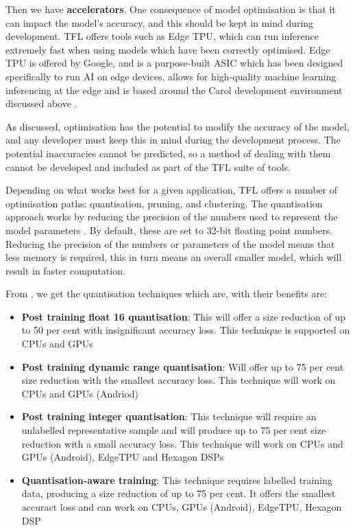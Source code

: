 \documentclass[conference]{IEEEtran}
\begin{document}
Then we have \textbf{accelerators}. One consequence of model optimisation is that it can impact the model's accuracy, and this should be kept in mind during development. TFL offers tools such as Edge TPU, which can run inference extremely fast when using models which have been correctly optimised. Edge TPU is offered by Google, and is a purpose-built ASIC which has been designed specifically to run AI on edge devices, allows for high-quality machine learning inferencing at the edge and is based around the Carol development environment discussed above \cite{b14}.

As discussed, optimisation has the potential to modify the accuracy of the model, and any developer must keep this in mind during the development process. The potential inaccuracies cannot be predicted, so a method of dealing with them cannot be developed and included as part of the TFL suite of tools.

Depending on what works best for a given application, TFL offers a number of optimisation paths: quantisation, pruning, and clustering. The quantisation approach works by reducing the precision of the numbers used to represent the model parameters \cite{b13}. By default, these are set to 32-bit floating point numbers. Reducing the precision of the numbers or parameters of the model means that less memory is required, this in turn means an overall smaller model, which will result in faster computation.

From \cite{b12}, we get the quantisation techniques which are, with their benefits are:

\begin{itemize}
    \item \textbf{Post training float 16 quantisation}: This will offer a size reduction of up to 50 per cent with insignificant accuracy loss. This technique is supported on CPUs and GPUs
    \item \textbf{Post training dynamic range quantisation}: Will offer up to 75 per cent size reduction with the smallest accuracy loss. This technique will work on CPUs and GPUs (Andriod)
    \item \textbf{Post training integer quantisation}: This technique will require an unlabelled representative sample and will produce up to 75 per cent size reduction with a small accuracy loss. This technique will work on CPUs and GPUs (Android), EdgeTPU and Hexagon DSPs
    \item \textbf{Quantisation-aware training}: This technique requires labelled training data, producing a size reduction of up to 75 per cent. It offers the smallest accuract loss and can work on CPUs, GPUs (Android), EdgeTPU, Hexagon DSP
\end{itemize}
\end{document}
